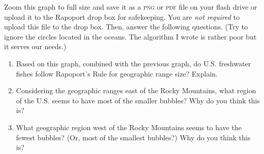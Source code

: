 \documentclass[11pt]{article}
\begin{document}
Zoom this graph to full size and save it as a \textsc{png} or 
\textsc{pdf} file on your flash drive or upload it to the Rapoport 
drop box for safekeeping. You are \emph{not required} to upload this 
file to the drop box. Then, answer the following questions. (Try 
to ignore the circles located in the oceans. The algorithm I wrote is 
rather poor but it serves our needs.)

\begin{enumerate}[resume]
	\item Based on this graph, combined with the previous graph, do
	U.S. freshwater fishes follow Rapoport's Rule for geographic range 
	size? Explain.

	\vspace{9\baselineskip}

	\item Considering the geographic ranges east of the Rocky
	Mountains, what region of the U.S. seems to have most of the
	smaller bubbles? Why do you think this is?

	\vspace{9\baselineskip}

	\item What geographic region west of the Rocky Mountains seems to
	have the fewest bubbles? (Or, most of the smallest bubbles?) Why 
	do you think this is? 
\end{enumerate}
\end{document}
